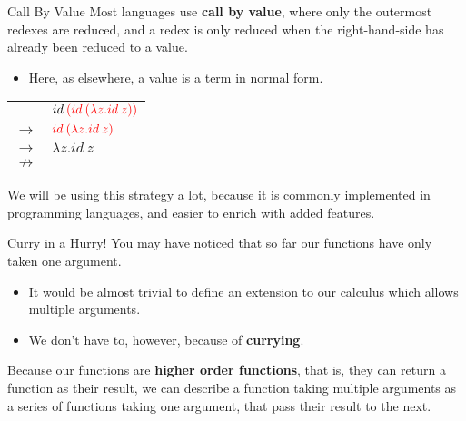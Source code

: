 \documentclass[11pt]{beamer}
\begin{document}
\begin{frame}[fragile=singleslide]{Call By Value}
Most languages use \textbf{call by value}, where only the outermost redexes are reduced, and a redex is only reduced when the right-hand-side has already been reduced to a value.
\begin{itemize}
\item Here, as elsewhere, a value is a term in normal form.
\end{itemize}
\vspace{1em}
\begin{center}
\begin{tabular}{c l}
& $ id\: {\color{red}(id\:(\lambda z. id\:z))}$ \\ 
$\rightarrow$ & ${\color{red} id\:(\lambda z. id\:z)}$ \\ 
$\rightarrow$ & $\lambda z. id\:z$ \\
$\nrightarrow$ &  \\
\end{tabular}
\end{center}

We will be using this strategy a lot, because it is commonly implemented in programming languages, and easier to enrich with added features.  
\end{frame}

\begin{frame}[fragile=singleslide]{Curry in a Hurry!}
You may have noticed that so far our functions have only taken one argument.  
\begin{itemize}
\item It would be almost trivial to define an extension to our calculus which allows multiple arguments.
\item We don't have to, however, because of \textbf{currying}.
\end{itemize}
Because our functions are \textbf{higher order functions}, that is, they can return a function as their result, we can describe a function taking multiple arguments as a series of functions taking one argument, that pass their result to the next.  
\end{frame}
\end{document}
